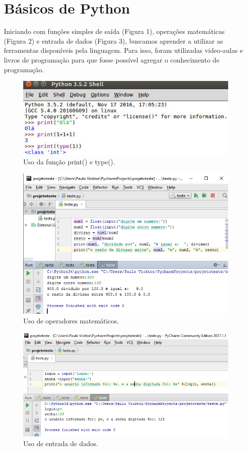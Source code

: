 \documentclass[12pt, a4paper, twocolumn]{article}
\begin{document}
\section{Básicos de Python}
Iniciando com funções simples de saída (Figura 1), operações matemáticas (Figura 2) e entrada de dados (Figura 3), buscamos aprender a utilizar as ferramentas disponíveis pela linguagem. Para isso, foram utilizadas video-aulas e livros de programação para que fosse possível agregar o conhecimento de programação.
\begin{figure}[htb!]
	\centering
	\includegraphics[scale = 0.45]{printss.jpg}
	\caption{Uso da função print() e type().}
\end{figure}
\begin{figure}[htb!]
	\centering
	\includegraphics[scale = 0.5] {operadores_matematicos.png}
	\caption{Uso de operadores matemáticos.}
\end{figure}
\begin{figure}[htb!]
	\centering
	\includegraphics[scale = 0.45] {entrada_dados.png}
	\caption{Uso de entrada de dados.}
\end{figure}
\end{document}
